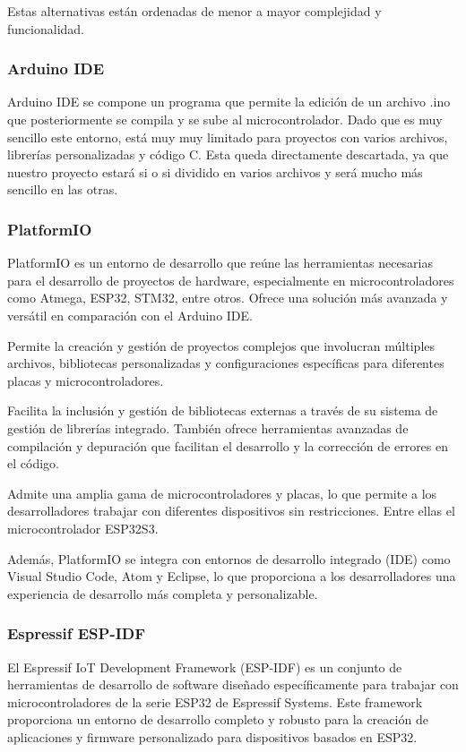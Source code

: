 Estas alternativas están ordenadas de menor a mayor complejidad y funcionalidad.
\subsubsection{Arduino IDE}
Arduino IDE se compone un programa que permite la edición de un archivo .ino que posteriormente se compila y se sube al microcontrolador. Dado que es muy sencillo este entorno, está muy muy limitado para proyectos con varios archivos, librerías personalizadas y código C. Esta queda directamente descartada, ya que nuestro proyecto estará si o si dividido en varios archivos y será mucho más sencillo en las otras.

\subsubsection{PlatformIO} \label{DiseñoPlatformIO}
PlatformIO es un entorno de desarrollo que reúne las herramientas necesarias para el desarrollo de proyectos de hardware, especialmente en microcontroladores como Atmega, ESP32, STM32, entre otros. Ofrece una solución más avanzada y versátil en comparación con el Arduino IDE.

Permite la creación y gestión de proyectos complejos que involucran múltiples archivos, bibliotecas personalizadas y configuraciones específicas para diferentes placas y microcontroladores.

Facilita la inclusión y gestión de bibliotecas externas a través de su sistema de gestión de librerías integrado. También ofrece herramientas avanzadas de compilación y depuración que facilitan el desarrollo y la corrección de errores en el código.

Admite una amplia gama de microcontroladores y placas, lo que permite a los desarrolladores trabajar con diferentes dispositivos sin restricciones. Entre ellas el microcontrolador ESP32S3.

Además, PlatformIO se integra con entornos de desarrollo integrado (IDE) como Visual Studio Code, Atom y Eclipse, lo que proporciona a los desarrolladores una experiencia de desarrollo más completa y personalizable.

\subsubsection{Espressif ESP-IDF}
El Espressif IoT Development Framework (ESP-IDF) es un conjunto de herramientas de desarrollo de software diseñado específicamente para trabajar con microcontroladores de la serie ESP32 de Espressif Systems. Este framework proporciona un entorno de desarrollo completo y robusto para la creación de aplicaciones y firmware personalizado para dispositivos basados en ESP32.

